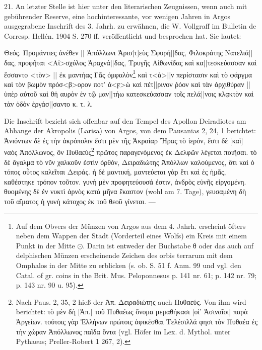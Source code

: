 \documentclass[a4paper, 11pt, oneside]{article}
\begin{document}
21. An letzter Stelle ist hier unter den literarischen Zeugnissen, wenn auch mit gebührender Reserve, eine hochinteressante, vor wenigen Jahren in Argos ausgegrabene Inschrift des 3. Jahrh. zu erwähnen, die W. Vollgraff im Bulletin de Corresp. Hellén. 1904 S. 270 ff. veröffentlicht und besprochen hat. Sie lautet:

Θεός. Προμάντιες ἀνέθεν || Ἀπόλλωνι Ἀρισ[τ]εὺς Σφυρή||δας, Φιλοκράτης Νατελιά||δας, προφῆται <Αἰ>σχύλος Ἀραχνά||δας, Τρυγῆς Αἰθωνίδας καὶ κα||τεσκεύασσαν καὶ ἕσσαντο <τὸν> || ἐκ μαντήας Γᾶς ὀμφαλὸν\footnote{Auf dem Obvers der Münzen von Argos aus dem 4. Jahrh. erscheint öfters neben dem Wappen der Stadt (Vorderteil eines Wolfs) ein Kreis mit einem Punkt in der Mitte $\odot$. Darin ist entweder der Buchstabe θ oder das auch auf delphischen Münzen erscheinende Zeichen des orbis terrarum mit dem Omphalos in der Mitte zu erblicken (s. ob. S. 51 f. Anm. 99 und vgl. den Catal. of gr. coins in the Brit. Mus. Peloponnesus p. 141 nr. 61; p. 142 nr. 79; p. 143 nr. 90 u. 95).} καὶ τ<ὰ>||ν περίστασιν καὶ τὸ φάργμα καὶ τὸν βωμὸν πρόσ<β>ορον ποτ' ἀ<ϝ>ὼ καὶ πέτ||ρινον ῥόον καὶ τὰν ἀρχιθύραν || ὑπὲρ αὐτοῦ καὶ θἡ αυρὸν ἐν τῷ μαν||τήω κατεσκεύασσαν τοῖς πελά||νοις κλᾳκτὸν καὶ τὰν ὁδὸν ἐργάσ||σαντο κ. τ. λ.

Die Inschrift bezieht sich offenbar auf den Tempel des Apollon Deiradiotes am Abhange der Akropolis (Larisa) von Argos, von dem Pausanias 2, 24, 1 berichtet: Ἀνιόντων δὲ ἐς τὴν ἀκρόπολιν ἔστι μὲν τῆς Ἀκραίαρ Ἥρας τὸ ἱερόν, ἔστι δὲ [καὶ] ναὸς Ἀπόλλωνος, ὃν Πυθαεὺς\footnote{Nach Paus. 2, 35, 2 hieß der Ἀπ. Δειραδιώτης auch Πυθαεύς. Von ihm wird berichtet: τὸ μὲν δὴ [Ἀπ.] τοῦ Πυθαέως ὄνομα μεμαθήκασι [οἱ' Ἀσιναῖοι] παρὰ Ἀργείων. τούτοις γὰρ Ἑλλήνων πρώτοις ἀφικέσθαι Τελέσιλλά φησι τὸν Πυθαέα ἐς τὴν χώραν Ἀπόλλωνος παῖδα ὄντα (vgl. Höfer im Lex. d. Mythol. unter Pythaeus; Preller-Robert 1 267, 2).} πρῶτος παραγενόμενος ἐκ Δελφῶν λέγεται ποιῆσαι. τὸ δὲ ἄγαλμα τὸ νῦν χαλκοῦν ἐστὶν ὀρθόν, Δειραδιώτης Ἀπόλλων καλούμενος, ὅτι καὶ ὁ τόπος οὗτος καλεῖται Δειράς. ἡ δὲ μαντική, μαντεύεται γὰρ ἔτι καὶ ἐς ἡμᾶς, καθέστηκε τρόπον τοῦτον. γυνὴ μὲν προφητεύουσά ἐστιν, ἀνδρὸς εὐνῆς εἰργομένη. θυομένης δὲ ἐν νυκτὶ ἀρνὸς κατὰ μῆνα ἕκαστον (wohl am 7. Tage), γευσαμένη δὴ τοῦ αἵματος ἡ γυνὴ κάτοχος ἐκ τοῦ θεοῦ γίνεται. ---
\end{document}
